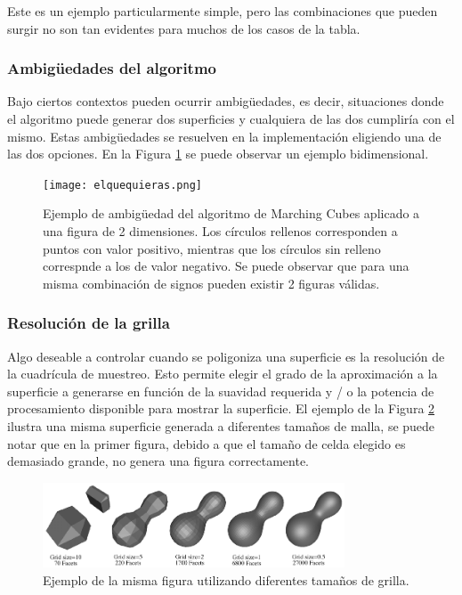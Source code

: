 \documentclass[12pt]{article}
\begin{document}
Este es un ejemplo particularmente simple, pero las combinaciones que pueden surgir no son tan evidentes para muchos de los casos de la tabla.

\subsubsection{Ambigüedades del algoritmo}
\noindent Bajo ciertos contextos  pueden ocurrir ambigüedades, es decir, situaciones donde el algoritmo puede generar dos superficies y cualquiera de las dos cumpliría con el mismo. Estas ambigüedades se resuelven en la implementación eligiendo una de las dos opciones. En la Figura \ref{ambig} se puede observar un ejemplo bidimensional.

\begin{figure}[h!]
\texttt{[image: elquequieras.png]}
\caption{Ejemplo de ambigüedad del algoritmo de Marching Cubes aplicado a una figura de 2 dimensiones. Los círculos rellenos corresponden a puntos con valor positivo, mientras que los círculos sin relleno correspnde a los de valor negativo. Se puede observar que para una misma combinación de signos pueden existir 2 figuras válidas.}
\label{ambig}
\end{figure}

\subsubsection{Resolución de la grilla}
\noindent Algo deseable a controlar cuando se poligoniza una superficie es la resolución de la cuadrícula de muestreo. Esto permite elegir el grado de la aproximación a la superficie a generarse en función de la suavidad requerida y / o la potencia de procesamiento disponible para mostrar la superficie. El ejemplo de la Figura \ref{mani} ilustra una misma superficie generada a diferentes tamaños de malla, se puede notar que en la primer figura, debido a que el tamaño de celda elegido es demasiado grande, no genera una figura correctamente.
\begin{figure}[h!]
\includegraphics[width=0.8\textwidth,center]{marchingcubes4.png}
\caption{Ejemplo de la misma figura utilizando diferentes tamaños de grilla.}
\label{mani}
\end{figure}
\\\\\\
\end{document}
